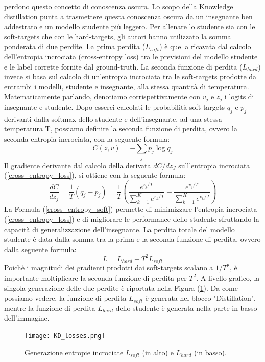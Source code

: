 perdono questo concetto di conoscenza oscura. Lo scopo della Knowledge 
distillation punta a trasmettere questa conoscenza oscura da un insegnante 
ben addestrato e un modello studente più leggero. Per allenare lo studente 
sia con le soft-targets che con le hard-targets, gli autori hanno utilizzato la 
somma ponderata di due perdite. La prima perdita ($L_{soft}$) è quella ricavata 
dal calcolo dell'entropia incrociata (cross-entropy loss) tra le previsioni del 
modello studente e le label corrette fornite dal ground-truth. La seconda 
funzione di perdita ($L_{hard}$) invece si basa sul calcolo di un'entropia incrociata 
tra le soft-targets prodotte da entrambi i modelli, studente e insegnante, 
alla stessa quantità di temperatura. Matematicamente parlando, denotiamo 
corrispettivamente con $v_j$ e $z_j$ i logits di insegnante e studente. Dopo esserci 
calcolati le probabilità soft-targets  $q_j$ e $p_j$ derivanti dalla softmax dello 
studente e dell'insegnante, ad una stessa temperatura T, possiamo definire 
la seconda funzione di perdita, ovvero la seconda entropia incrociata, con la 
seguente formula:
\begin{equation}\label{cross_entropy_loss}
    C(z,v) = -\sum_jp_j \log{q_j}
\end{equation}
Il gradiente derivante dal calcolo della derivata $dC/dz_J$ sull'entropia incrociata 
(\ref{cross_entropy_loss}), si ottiene con la seguente formula:
\begin{equation}\label{cross_entropy_soft}
    \frac{dC}{dz_j}=\frac{1}{T}(q_j-p_j)=\frac{1}{T}\left(\frac{e^{z_j/T}}{\sum_{k=1}^K e^{z_k/T}}-\frac{e^{v_j/T}}{\sum_{k=1}^K e^{v_k/T}}\right)
\end{equation}
La Formula (\ref{cross_entropy_soft}) permette di minimizzare l'entropia incrociata (\ref{cross_entropy_loss}) 
e di migliorare le performance dello studente sfruttando la capacità di 
generalizzazione dell'insegnante. La perdita totale del modello studente è 
data dalla somma tra la prima e la seconda funzione di perdita, ovvero 
dalla seguente formula:
\begin{equation}
    L= L_{hard}+T^2L_{soft}
\end{equation}
Poichè i magnitudi dei gradienti prodotti dai soft-targets scalano a $1/T^2$, 
è importante moltiplicare la seconda funzione di perdita per $T^2$. A livello 
grafico, la singola generazione delle due perdite è riportata nella Figura 
(\ref{l_hard_soft}). Da come possiamo vedere, la funzione di perdita $L_{soft}$ è generata 
nel blocco "Distillation", mentre la funzione di perdita $L_{hard}$ dello studente 
è generata nella parte in basso dell'immagine.
\begin{figure}
    \centering
    \texttt{[image: KD\_losses.png]}
    \centering
    \caption{Generazione entropie incrociate $L_{soft}$ (in alto) e $L_{hard}$ (in basso).}
    \label{l_hard_soft}
\end{figure}